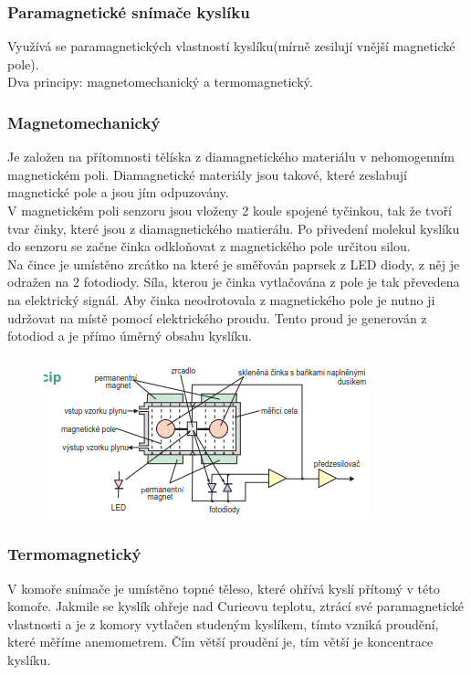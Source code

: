 \subsubsection{Paramagnetické snímače kyslíku}
Využívá se paramagnetických vlastností kyslíku(mírně zesilují vnější magnetické pole).\\
Dva principy: magnetomechanický a termomagnetický.\\
\subsubsection*{Magnetomechanický}
Je založen na přítomnosti tělíska z diamagnetického materiálu v nehomogenním magnetickém poli. Diamagnetické materiály jsou takové, které zeslabují magnetické pole a jsou jím odpuzovány.\\
V magnetickém poli senzoru jsou vloženy 2 koule spojené tyčinkou, tak že tvoří tvar činky, které jsou z diamagnetického matierálu. Po přivedení molekul kyslíku do senzoru se začne činka odkloňovat z magnetického pole určitou silou.\\
Na čince je umístěno zrcátko na které je směřován paprsek z LED diody, z něj je odražen na 2 fotodiody. Síla, kterou je činka vytlačována z pole je tak převedena na elektrický signál. Aby činka neodrotovala z magnetického pole je nutno ji udržovat na místě pomocí elektrického proudu. Tento proud je generován z fotodiod a je přímo úměrný obsahu kyslíku.\\
\begin{figure}[h!]
    \centering
    \includegraphics[scale = 0.5]{img/Paramag1.png}
\end{figure}

\subsubsection*{Termomagnetický}
V komoře snímače je umístěno topné těleso, které ohřívá kyslí přítomý v této komoře. Jakmile se kyslík ohřeje nad Curieovu teplotu, ztrácí své paramagnetické vlastnosti a je z komory vytlačen studeným kyslíkem, tímto vzniká proudění, které měříme anemometrem. Čím větší proudění je, tím větší je koncentrace kyslíku.\\

